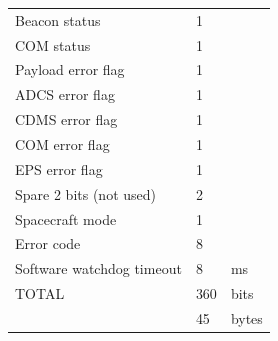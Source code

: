 \begin{apendicesenv}
\begin{table}[h]
{\begin{tabular}{@{}lll@{}}
Beacon status                            & 1                        &                            \\
COM status                               & 1                        &                            \\
Payload error flag                       & 1                        &                            \\
ADCS error flag                          & 1                        &                            \\
CDMS error flag                          & 1                        &                            \\
COM error flag                           & 1                        &                            \\
EPS error flag                           & 1                        &                            \\
Spare 2 bits (not used)                  & 2                        &                            \\
Spacecraft mode                          & 1                        &                            \\
Error code                               & 8                        &                            \\
Software watchdog timeout                & 8                        & ms                         \\ \midrule
\multicolumn{1}{|l|}{TOTAL}               & 360                      & \multicolumn{1}{l|}{bits}  \\
\multicolumn{1}{|l|}{}                    & 45                       & \multicolumn{1}{l|}{bytes} \\ \bottomrule
\end{tabular}}
\end{table}




\end{apendicesenv}
